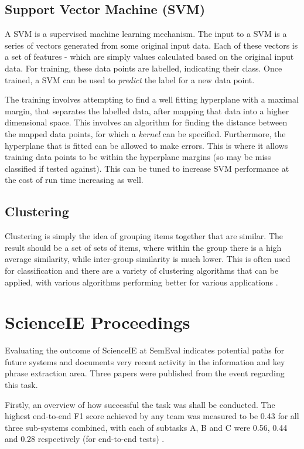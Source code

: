 \subsection*{Support Vector Machine (SVM)}
A SVM is a supervised machine learning mechanism. The input to a SVM is a series of vectors generated from some original input data. Each of these vectors is a set of features - which are simply values calculated based on the original input data. For training, these data points are labelled, indicating their class. Once trained, a SVM can be used to \textit{predict} the label for a new data point.

The training involves attempting to find a well fitting hyperplane with a maximal margin, that separates the labelled data, after mapping that data into a higher dimensional space. This involves an algorithm for finding the distance between the mapped data points, for which a \textit{kernel} can be specified. Furthermore, the hyperplane that is fitted can be allowed to make errors. This is where it allows training data points to be within the hyperplane margins (so may be miss classified if tested against). This can be tuned to increase SVM performance at the cost of run time increasing as well.

\subsection*{Clustering}
Clustering is simply the idea of grouping items together that are similar. The result should be a set of sets of items, where within the group there is a high average similarity, while inter-group similarity is much lower. This is often used for classification and there are a variety of clustering algorithms that can be applied, with various algorithms performing better for various applications \cite{Rai2010}.

\section{ScienceIE Proceedings}
Evaluating the outcome of ScienceIE at SemEval indicates potential paths for future systems and documents very recent activity in the information and key phrase extraction area. Three papers were published from the event regarding this task.

Firstly, an overview of how successful the task was shall be conducted. The highest end-to-end F1 score achieved by any team was measured to be 0.43 for all three sub-systems combined, with each of subtasks A, B and C were 0.56, 0.44 and 0.28 respectively (for end-to-end tests) \cite{Augenstein2017}. 

